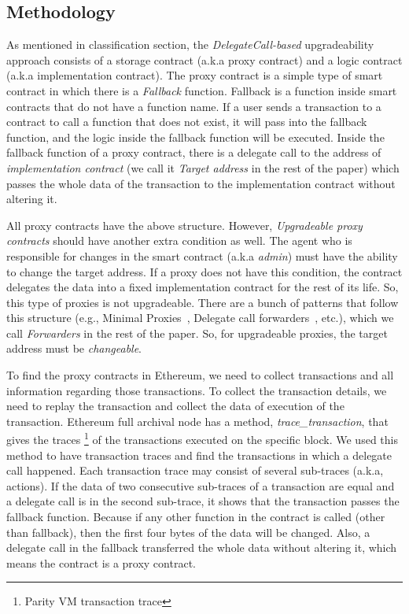 \subsection{Methodology} 
As mentioned in classification section, the \textit{DelegateCall-based} upgradeability approach consists of a storage contract (a.k.a proxy contract) and a logic contract (a.k.a implementation contract). 
The proxy contract is a simple type of smart contract in which there is a \textit{Fallback} function. Fallback is a function inside smart contracts that do not have a function name. If a user sends a transaction to a contract to call a function that does not exist, it will pass into the fallback function, and the logic inside the fallback function will be executed. Inside the fallback function of a proxy contract, there is a delegate call to the address of \textit{implementation contract} (we call it \emph{Target address} in the rest of the paper) which passes the whole data of the transaction to the implementation contract without altering it.

All proxy contracts have the above structure. However, \textit{Upgradeable proxy contracts} should have another extra condition as well. The agent who is responsible for changes in the smart contract (a.k.a \emph{admin}) must have the ability to change the target address. If a proxy does not have this condition, the contract delegates the data into a fixed implementation contract for the rest of its life. So, this type of proxies is not upgradeable. There are a bunch of patterns that follow this structure (e.g., Minimal Proxies~\cite{minimalProxy}, Delegate call forwarders~\cite{delegatecallForwarders}, etc.), which we call \textit{Forwarders} in the rest of the paper. So, for upgradeable proxies, the target address must be \emph{changeable}.

To find the proxy contracts in Ethereum, we need to collect transactions and all information regarding those transactions. To collect the transaction details, we need to replay the transaction and collect the data of execution of the transaction. Ethereum full archival node has a method, \textit{trace\_transaction}, that gives the traces \footnote{Parity VM transaction trace} of the transactions executed on the specific block. We used this method to have transaction traces and find the transactions in which a delegate call happened. Each transaction trace may consist of several sub-traces (a.k.a, actions).
If the data of two consecutive sub-traces of a transaction are equal and a delegate call is in the second sub-trace, it shows that the transaction passes the fallback function. Because if any other function in the contract is called (other than fallback), then the first four bytes of the data will be changed. Also, a delegate call in the fallback transferred the whole data without altering it, which means the contract is a proxy contract.

